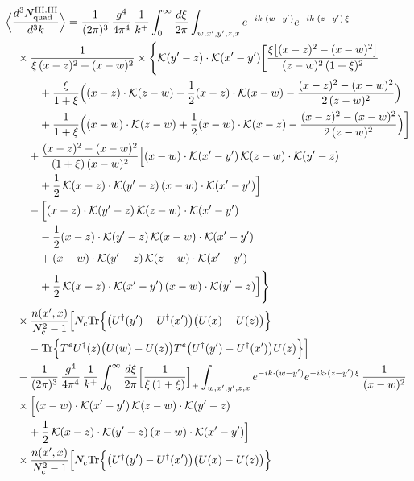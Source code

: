 \begin{align}\label{eq:S-III.III-2o}
&\Big\langle\frac{d^{3}N^{\rm III.III}_{{\rm quad}}}{d^{3}k}\Big\rangle=\frac{1}{(2\pi)^{3}}\, \frac{g^{4}}{4\pi^{4}}\, \frac{1}{k^{+}} \int_{0}^{\infty}\frac{d\xi}{2\pi} \int_{w,x',y',z,x}e^{-ik\cdot(w-y')}e^{-ik\cdot(z-y')\,\xi}\notag\\
&\quad \times \frac{1}{\xi\,(x-z)^{2}+(x-w)^{2}} \times\Bigg\{\Kv(y'-z)\cdot\Kv(x'-y')\bigg[\frac{\xi\big[(x-z)^{2}-(x-w)^{2}\big]}{(z-w)^{2}\,(1+\xi)^{2}}\notag\\
&\quad\quad\quad +\frac{\xi}{1+\xi}\Big((x-z)\cdot\Kv(z-w)-\frac{1}{2}(x-z)\cdot\Kv(x-w)-\frac{(x-z)^{2}-(x-w)^{2}}{2\,(z-w)^{2}}\Big)\notag\\
&\quad\quad\quad +\frac{1}{1+\xi}\Big((x-w)\cdot\Kv(z-w)+\frac{1}{2}(x-w)\cdot\Kv(x-z)-\frac{(x-z)^{2}-(x-w)^{2}}{2\,(z-w)^{2}}\Big)\bigg]\notag\\
&\quad\quad +\frac{(x-z)^{2}-(x-w)^{2}}{(1+\xi)\,(x-w)^{2}}\Big[(x-w)\cdot\Kv(x'-y')\, \Kv(z-w)\cdot\Kv(y'-z)\notag\\
&\quad\quad\quad +\frac{1}{2}\, \Kv(x-z)\cdot\Kv(y'-z)\, (x-w)\cdot\Kv(x'-y')\Big]\notag\\
&\quad\quad -\Big[(x-z)\cdot\Kv(y'-z)\, \Kv(z-w)\cdot\Kv(x'-y')\notag\\
&\quad\quad\quad -\frac{1}{2}(x-z)\cdot\Kv(y'-z)\, \Kv(x-w)\cdot\Kv(x'-y')\notag\\
&\quad\quad\quad +(x-w)\cdot\Kv(y'-z)\, \Kv(z-w)\cdot\Kv(x'-y')\notag\\
&\quad\quad\quad +\frac{1}{2}\, \Kv(x-z)\cdot\Kv(x'-y')\, (x-w)\cdot\Kv(y'-z)\Big]\Bigg\}\notag\\
&\quad \times\frac{n(x',x)}{N_{c}^{2}-1}\Big[N_{c}{\rm Tr}\Big\{\big(U^{\dagger}(y')-U^{\dagger}(x')\big)\big(U(x)-U(z)\big)\Big\}\notag\\
&\quad\quad -{\rm Tr}\Big\{T^{e}U^{\dagger}(z)\big(U(w)-U(z)\big)T^{e}\big(U^{\dagger}(y')-U^{\dagger}(x')\big)U(z)\Big\}\Big]\notag\\
&\quad -\frac{1}{(2\pi)^{3}}\, \frac{g^{4}}{4\pi^{4}}\, \frac{1}{k^{+}} \int_{0}^{\infty}\frac{d\xi}{2\pi}\Big[\frac{1}{\xi\,(1+\xi)}\Big]_{+} \int_{w,x',y',z,x}e^{-ik\cdot(w-y')}e^{-ik\cdot(z-y')\,\xi}\, \frac{1}{(x-w)^{2}}\notag\\
&\quad \times\Big[(x-w)\cdot\Kv(x'-y')\, \Kv(z-w)\cdot\Kv(y'-z)\notag\\
&\quad\quad +\frac{1}{2}\, \Kv(x-z)\cdot\Kv(y'-z)\, (x-w)\cdot\Kv(x'-y')\Big]\notag\\
&\quad \times\frac{n(x',x)}{N_{c}^{2}-1}\Big[N_{c}{\rm Tr}\Big\{\big(U^{\dagger}(y')-U^{\dagger}(x')\big)\big(U(x)-U(z)\big)\Big\}\notag\\

\end{align}
